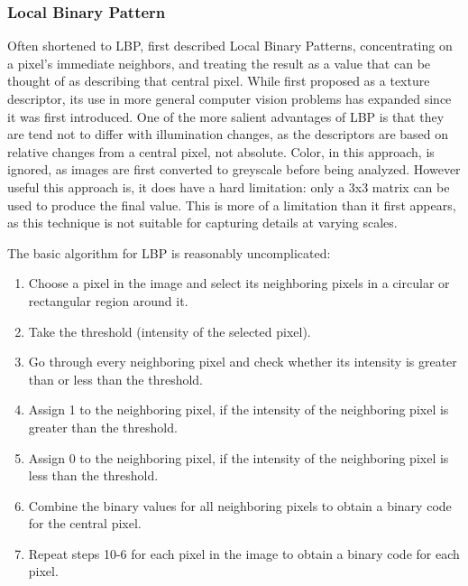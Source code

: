 \documentclass[letterpaper]{article}
\begin{document}
{\subsubsection{Local Binary Pattern}
Often shortened to LBP, \citeauthor{Ojala1996-ps} first described Local Binary Patterns, concentrating on a pixel's immediate neighbors, and treating the result as a value that can be thought of as describing that central pixel. While first proposed as a texture descriptor, its use in more general computer vision problems has expanded since it was first introduced. One of the more salient advantages of LBP is that they are tend not to differ with illumination changes, as the descriptors are based on relative changes from a central pixel, not absolute. Color, in this approach, is ignored, as images are first converted to greyscale before being analyzed. However useful this approach is, it does have a hard limitation: only a 3x3 matrix can be used to produce the final value. This is more of a limitation than it first appears, as this technique is not suitable for capturing details at varying scales.

The basic algorithm for LBP is reasonably uncomplicated:
\begin{enumerate}
	\item{Choose a pixel in the image and select its neighboring pixels in a circular or rectangular region around it.}
	\item{Take the threshold (intensity of the selected pixel).}
	\item{Go through every neighboring pixel and check whether its intensity is greater than or less than the threshold.}
	\item{Assign 1 to the neighboring pixel, if the intensity of the neighboring pixel is greater than the threshold.}
	\item{Assign 0 to the neighboring pixel, if the intensity of the neighboring pixel is less than the threshold.}
	\item{Combine the binary values for all neighboring pixels to obtain a binary code for the central pixel.}
	\item{Repeat steps 10-6 for each pixel in the image to obtain a binary code for each pixel.}
\end{enumerate}

}
\end{document}
